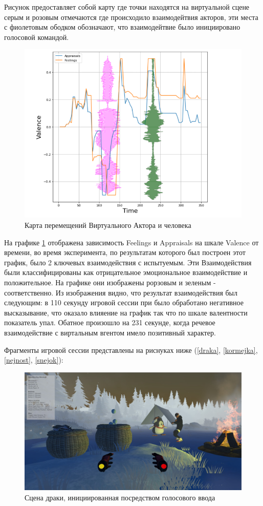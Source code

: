 Рисунок предоставляет собой карту где точки находятся на виртуальной сцене 
серым и розовым отмечаются где происходило взаимодейтвия акторов, эти 
места с фиолетовым ободком обозначают, что взаимодейтвие было инициировано
голосовой командой.

\begin{figure}[h]
\includegraphics[width=0.75\columnwidth]{./img/GRAFIK.png}
\centering
\caption{Карта перемещений Виртуального Актора и человека}
\label{pic:grafik_res}
\end{figure}

На графике \ref{pic:grafik_res} отображена зависимость Feelings и Appraisals
на шкале Valence от времени, во время эксперимента, по результатам которого 
был построен этот график, было 2 ключевых взаимодействия с испытуемым. Эти
Взаимодействия были классифицированы как отрицательное эмоциональное взаимодействие и положительное.
На графике они изображены рорзовым и зеленым - соответственно.
Из изображения видно, что результат взаимодействия был следующим:
в 110 секунду игровой сессии при было обработано негативное высказывание, что 
оказало влияение на график так что по шкале валентности показатель упал.
Обатное произошло на 231 секунде, когда речевое взаимодействие с виртальным 
вгентом имело позитивный характер.

Фрагменты игровой сессии представлены на риснуках ниже (\ref{draka}, \ref{kormejka}, \ref{nejnost}, \ref{snejok}):

\begin{figure}[h]
\includegraphics[width=0.75\columnwidth]{./img/peni/draka_obosraka.jpg}
\centering
\caption{Сцена драки, инициированная посредством голосового ввода}
\label{pic:draka}
\end{figure}



